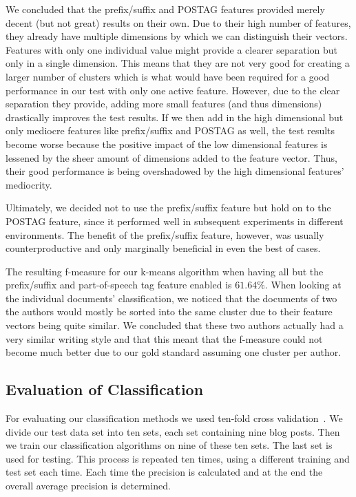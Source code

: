 We concluded that the prefix/suffix and POSTAG features provided merely decent (but not great) results on their own.
Due to their high number of features, they already have multiple dimensions by which we can distinguish their vectors.
Features with only one individual value might provide a clearer separation but only in a single dimension.
This means that they are not very good for creating a larger number of clusters which is what would have been required for a good performance in our test with only one active feature.
However, due to the clear separation they provide, adding more small features (and thus dimensions) drastically improves the test results.
If we then add in the high dimensional but only mediocre features like prefix/suffix and POSTAG as well, the test results become worse because the positive impact of the low dimensional features is lessened by the sheer amount of dimensions added to the feature vector.
Thus, their good performance is being overshadowed by the high dimensional features' mediocrity.


Ultimately, we decided not to use the prefix/suffix feature but hold on to the POSTAG feature, since it performed well in subsequent experiments in different environments.
The benefit of the prefix/suffix feature, however, was usually counterproductive and only marginally beneficial in even the best of cases.


The resulting f-measure for our k-means algorithm when having all but the prefix/suffix and part-of-speech tag feature enabled is $61.64\%$.
When looking at the individual documents' classification, we noticed that the documents of two the authors would mostly be sorted into the same cluster due to their feature vectors being quite similar.
We concluded that these two authors actually had a very similar writing style and that this meant that the f-measure could not become much better due to our gold standard assuming one cluster per author.


\subsection{Evaluation of Classification}
For evaluating our classification methods we used ten-fold cross validation~\cite{kohavi1995study}.
We divide our test data set into ten sets, each set containing nine blog posts.
Then we train our classification algorithms on nine of these ten sets.
The last set is used for testing.
This process is repeated ten times, using a different training and test set each time.
Each time the precision is calculated and at the end the overall average precision is determined.


